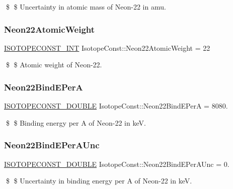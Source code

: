\$ \$ Uncertainty in atomic mass of Neon-\/22 in amu. \mbox{\label{group___isotope_const-_neon-_ne22_gac6187de1bc99eb0768e5681f8fc05b1c}} 
\subsubsection{\texorpdfstring{Neon22\+Atomic\+Weight}{Neon22AtomicWeight}}
{\footnotesize\ttfamily \mbox{\hyperlink{group___isotope_const-_macros_ga5f18360b3e99483a35c32d789e62621c}{I\+S\+O\+T\+O\+P\+E\+C\+O\+N\+S\+T\+\_\+\+I\+NT}} Isotope\+Const\+::\+Neon22\+Atomic\+Weight = 22}

\$ \$ Atomic weight of Neon-\/22. \mbox{\label{group___isotope_const-_neon-_ne22_ga9c865f40cf54731a1d63c52ff8924735}} 
\subsubsection{\texorpdfstring{Neon22\+Bind\+E\+PerA}{Neon22BindEPerA}}
{\footnotesize\ttfamily \mbox{\hyperlink{group___isotope_const-_macros_ga8f45a7272ce02c0b4c65c44636ed719a}{I\+S\+O\+T\+O\+P\+E\+C\+O\+N\+S\+T\+\_\+\+D\+O\+U\+B\+LE}} Isotope\+Const\+::\+Neon22\+Bind\+E\+PerA = 8080.}

\$ \$ Binding energy per A of Neon-\/22 in keV. \mbox{\label{group___isotope_const-_neon-_ne22_ga214063984ea6b6c23e0ade344c10a933}} 
\subsubsection{\texorpdfstring{Neon22\+Bind\+E\+Per\+A\+Unc}{Neon22BindEPerAUnc}}
{\footnotesize\ttfamily \mbox{\hyperlink{group___isotope_const-_macros_ga8f45a7272ce02c0b4c65c44636ed719a}{I\+S\+O\+T\+O\+P\+E\+C\+O\+N\+S\+T\+\_\+\+D\+O\+U\+B\+LE}} Isotope\+Const\+::\+Neon22\+Bind\+E\+Per\+A\+Unc = 0.}

\$ \$ Uncertainty in binding energy per A of Neon-\/22 in keV. \mbox{\label{group___isotope_const-_neon-_ne22_gada98c88d10fdc0ddb867889c8f20c3d3}} 
